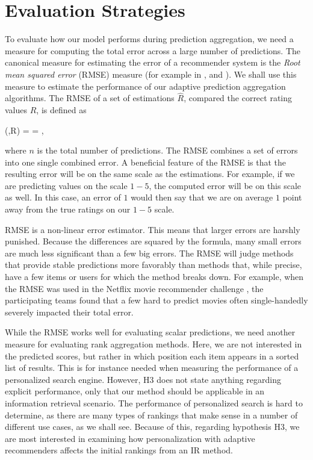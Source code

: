 \section{Evaluation Strategies}

To evaluate how our model performs during prediction aggregation, 
we need a measure for computing the total error across a large number of predictions.
The canonical measure for estimating the error of a recommender system
is the \emph{Root mean squared error} (RMSE) measure
(for example in \citet[p.17]{Herlocker2004}, \citet[p.13]{Adomavicius2005} and \citet[p.6]{Bell2007}).
We shall use this measure to estimate the performance
of our adaptive prediction aggregation algorithms.
The RMSE of a set of estimations $\hat{R}$, 
compared the correct rating values $R$, is defined as

\begin{eqsp}
  (,R) = 
  = ,
\end{eqsp}
%
where $n$ is the total number of predictions.
The RMSE combines a set of errors into one single combined error.
A beneficial feature of the RMSE is that the resulting error 
will be on the same scale as the estimations. For example,
if we are predicting values on the scale $1-5$, the computed error
will be on this scale as well. In this case, an error of $1$
would then say that we are on average $1$ point away from the true 
ratings on our $1-5$ scale.

RMSE is a non-linear error estimator.
This means that larger errors are harshly punished.
Because the differences are squared by the formula,
many small errors are much less significant than a few big errors.
The RMSE will judge methods that provide
stable predictions more favorably
than methods that, while precise, have a few items
or users for which the method breaks down.
For example, when the RMSE was used in the Netflix movie recommender challenge
\citep{Linden2009}, the participating teams
found that a few hard to predict movies often 
single-handedly severely impacted their total error.

While the RMSE works well for evaluating scalar predictions,
we need another measure for evaluating rank aggregation methods.
Here, we are not interested in the predicted scores,
but rather in which position each item appears in a sorted list of results.
This is for instance needed when measuring the performance of a
personalized search engine.
However, H3 does not state anything regarding explicit performance,
only that our method should be applicable in an information retrieval scenario.
The performance of personalized search is hard to determine,
as there are many types of rankings that make sense in a number of different use cases,
as we shall see.
Because of this, regarding hypothesis H3, 
we are most interested in examining how  personalization with adaptive recommenders 
affects the initial rankings from an IR method.



